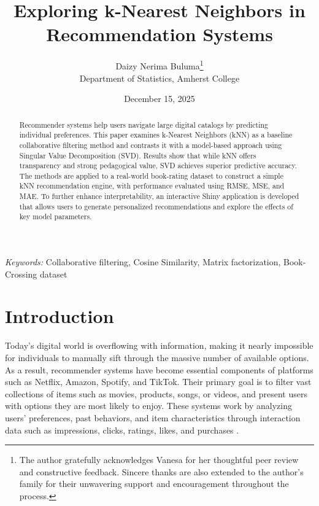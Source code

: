 \documentclass[
  12pt]{article}
\begin{document}
\def\spacingset#1{\renewcommand{\baselinestretch}%
{#1}\small\normalsize} \spacingset{1}



\date{December 15, 2025}
\title{\bf \textbf{Exploring k-Nearest Neighbors in Recommendation
Systems}}
\author{
Daizy Nerima Buluma\thanks{The author gratefully acknowledges Vanesa for
her thoughtful peer review and constructive feedback. Sincere thanks are
also extended to the author's family for their unwavering support and
encouragement throughout the process.}\\
Department of Statistics, Amherst College\\
}
\maketitle

\bigskip
\bigskip
\begin{abstract}
Recommender systems help users navigate large digital catalogs by
predicting individual preferences. This paper examines k-Nearest
Neighbors (kNN) as a baseline collaborative filtering method and
contrasts it with a model-based approach using Singular Value
Decomposition (SVD). Results show that while kNN offers transparency and
strong pedagogical value, SVD achieves superior predictive accuracy. The
methods are applied to a real-world book-rating dataset to construct a
simple kNN recommendation engine, with performance evaluated using RMSE,
MSE, and MAE. To further enhance interpretability, an interactive Shiny
application is developed that allows users to generate personalized
recommendations and explore the effects of key model parameters.
\end{abstract}

\noindent%
{\it Keywords:} Collaborative filtering, Cosine Similarity, Matrix
factorization, Book-Crossing dataset
\vfill

\newpage
\spacingset{1.9} %


\section{\texorpdfstring{\textbf{Introduction}}{Introduction}}\label{introduction}

Today's digital world is overflowing with information, making it nearly
impossible for individuals to manually sift through the massive number
of available options. As a result, recommender systems have become
essential components of platforms such as Netflix, Amazon, Spotify, and
TikTok. Their primary goal is to filter vast collections of items such
as movies, products, songs, or videos, and present users with options
they are most likely to enjoy. These systems work by analyzing users'
preferences, past behaviors, and item characteristics through
interaction data such as impressions, clicks, ratings, likes, and
purchases \citep{ghosh2024}.
\end{document}
